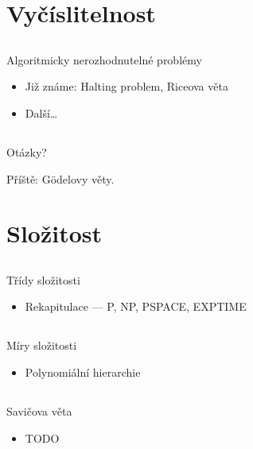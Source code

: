 \documentclass{beamer}
\begin{document}
\section{Vyčíslitelnost}

\subsection{}
\begin{frame}{Algoritmicky nerozhodnutelné problémy}
\begin{itemize}
\item Již známe: Halting problem, Riceova věta
\item Další\dots
\end{itemize}
\end{frame}

\subsection{}
\begin{frame}{Otázky?}
\begin{center}
Příště: Gödelovy věty.
\end{center}
\end{frame}

\section{Složitost}

\subsection{}
\begin{frame}{Třídy složitosti}
\begin{itemize}
\item Rekapitulace --- P, NP, PSPACE, EXPTIME
\end{itemize}
\end{frame}

\subsection{}
\begin{frame}{Míry složitosti}
\begin{itemize}
\item Polynomiální hierarchie
\end{itemize}
\end{frame}

\subsection{}
\begin{frame}{Savičova věta}
\begin{itemize}
\item TODO
\end{itemize}
\end{frame}
\end{document}
